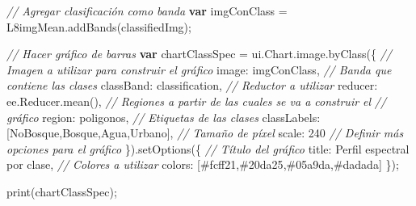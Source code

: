 \documentclass[
  12pt,
  letterpaper,
  twoside]{book}
\newenvironment{Shaded}{\begin{snugshade}}{\end{snugshade}}
\newcommand{\AttributeTok}[1]{\textcolor[rgb]{0.48,0.12,0.64}{#1}}
\newcommand{\CommentTok}[1]{\textcolor[rgb]{0.24,0.58,0.00}{\textit{#1}}}
\newcommand{\DataTypeTok}[1]{\textcolor[rgb]{0.00,0.00,0.00}{#1}}
\newcommand{\DecValTok}[1]{\textcolor[rgb]{0.28,0.53,0.93}{#1}}
\newcommand{\FunctionTok}[1]{\textcolor[rgb]{0.48,0.12,0.64}{#1}}
\newcommand{\KeywordTok}[1]{\textcolor[rgb]{0.00,0.00,0.00}{\textbf{#1}}}
\newcommand{\NormalTok}[1]{#1}
\newcommand{\OperatorTok}[1]{\textcolor[rgb]{0.00,0.00,0.00}{#1}}
\newcommand{\StringTok}[1]{\textcolor[rgb]{0.87,0.29,0.22}{#1}}
\begin{document}
\begin{Shaded}
\begin{Highlighting}[]
\CommentTok{// Agregar clasificación como banda}
\KeywordTok{var}\NormalTok{ imgConClass }\OperatorTok{=}\NormalTok{ L8imgMean}\OperatorTok{.}\FunctionTok{addBands}\NormalTok{(classifiedImg)}\OperatorTok{;}

\CommentTok{// Hacer gráfico de barras}
\KeywordTok{var}\NormalTok{ chartClassSpec }\OperatorTok{=}\NormalTok{ ui}\OperatorTok{.}\AttributeTok{Chart}\OperatorTok{.}\AttributeTok{image}\OperatorTok{.}\FunctionTok{byClass}\NormalTok{(\{}
  \CommentTok{// Imagen a utilizar para construir el gráfico}
  \DataTypeTok{image}\OperatorTok{:}\NormalTok{ imgConClass}\OperatorTok{,}
  \CommentTok{// Banda que contiene las clases}
  \DataTypeTok{classBand}\OperatorTok{:} \StringTok{\textquotesingle{}classification\textquotesingle{}}\OperatorTok{,}
  \CommentTok{// Reductor a utilizar}
  \DataTypeTok{reducer}\OperatorTok{:}\NormalTok{ ee}\OperatorTok{.}\AttributeTok{Reducer}\OperatorTok{.}\FunctionTok{mean}\NormalTok{()}\OperatorTok{,}
  \CommentTok{// Regiones a partir de las cuales se va a construir el }
  \CommentTok{// gráfico}
  \DataTypeTok{region}\OperatorTok{:}\NormalTok{ poligonos}\OperatorTok{,}
  \CommentTok{// Etiquetas de las clases}
  \DataTypeTok{classLabels}\OperatorTok{:}\NormalTok{ [}\StringTok{\textquotesingle{}NoBosque\textquotesingle{}}\OperatorTok{,}\StringTok{\textquotesingle{}Bosque\textquotesingle{}}\OperatorTok{,}\StringTok{\textquotesingle{}Agua\textquotesingle{}}\OperatorTok{,}\StringTok{\textquotesingle{}Urbano\textquotesingle{}}\NormalTok{]}\OperatorTok{,}
  \CommentTok{// Tamaño de píxel}
  \DataTypeTok{scale}\OperatorTok{:} \DecValTok{240}
  \CommentTok{// Definir más opciones para el gráfico}
\NormalTok{\})}\OperatorTok{.}\FunctionTok{setOptions}\NormalTok{(\{}
  \CommentTok{// Título del gráfico}
  \DataTypeTok{title}\OperatorTok{:} \StringTok{\textquotesingle{}Perfil espectral por clase\textquotesingle{}}\OperatorTok{,}
  \CommentTok{// Colores a utilizar}
  \DataTypeTok{colors}\OperatorTok{:}\NormalTok{ [}\StringTok{\textquotesingle{}\#fcff21\textquotesingle{}}\OperatorTok{,}\StringTok{\textquotesingle{}\#20da25\textquotesingle{}}\OperatorTok{,}\StringTok{\textquotesingle{}\#05a9da\textquotesingle{}}\OperatorTok{,}\StringTok{\textquotesingle{}\#dadada\textquotesingle{}}\NormalTok{]}
\NormalTok{\})}\OperatorTok{;}

\FunctionTok{print}\NormalTok{(chartClassSpec)}\OperatorTok{;}
\end{Highlighting}
\end{Shaded}
\end{document}
